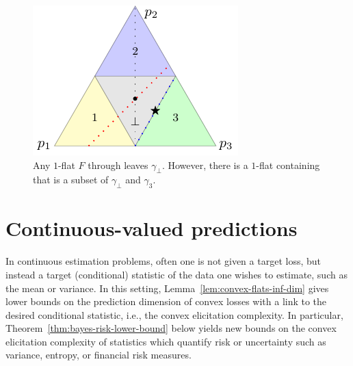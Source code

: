 \documentclass[anon,12pt]{colt2021} %
\newcommand{\ones}{\mathbbm{1}}
\begin{document}
\begin{figure}[ht]
\begin{minipage}{0.45\linewidth}
	\includegraphics[width=\linewidth]{tikz/flats-bound.pdf}
	\caption{Any $1$-flat $F$ through \textbullet leaves $\gamma_\bot$.
	However, there is a $1$-flat containing {\color{blue} \textbullet} that is a subset of $\gamma_\bot$ and $\gamma_3$.
	}
	\label{fig:flats-bound}
\end{minipage}
\end{figure}

\section{Continuous-valued predictions}\label{sec:contin-consis}

In continuous estimation problems, often one is not given a target loss, but instead a target (conditional) statistic of the data one wishes to estimate, such as the mean or variance.
In this setting, Lemma~\ref{lem:convex-flats-inf-dim} gives lower bounds on the prediction dimension of convex losses with a link to the desired conditional statistic, i.e., the convex elicitation complexity.
In particular,
Theorem~\ref{thm:bayes-risk-lower-bound} below yields new bounds on the convex elicitation complexity of statistics which quantify risk or uncertainty such as variance, entropy, or financial risk measures.
\end{document}
